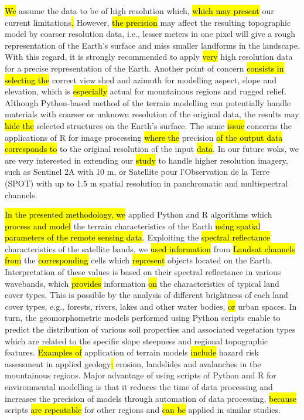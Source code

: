\documentclass[jimaging,article,submit,pdftex,moreauthors]{Definitions/mdpi}
\begin{document}
\hl{We }assume the data to be of high resolution which, \hl{which may present} our current limitations\hl{. }However, \hl{the precision }may affect the resulting topographic model by coarser\hl{ }resolution data, i.e., lesser meters in one pixel will give a rough representation of the Earth's surface and miss smaller landforms in the landscape. With this regard, it is strongly recommended to apply \hl{very }high resolution data for a precise representation of the Earth. Another point of concern \hl{consists in selecting the} correct view shed and azimuth for modelling aspect, slope and elevation, which is \hl{especially} actual for\hl{ }mountainous regions and rugged relief.\hl{ }Although Python-based method of the terrain modelling can potentially handle materials with coarser or unknown resolution of the original data, the results may \hl{hide the} selected structures on the Earth's surface. The same \hl{issue} concerns the applications of R for image processing \hl{where the} precision \hl{of the output data corresponds to } to the original resolution of the input \hl{data}. In our future woks, we are very interested in extending our \hl{study} to handle higher resolution imagery, such as Sentinel 2A with 10 m, or Satellite pour l'Observation de la Terre (SPOT) with up to 1.5 m spatial resolution in panchromatic and multispectral channels.

\hl{In the presented methodology, we} applied Python and R algorithms which \hl{process and model} the terrain characteristics of the Earth \hl{using spatial parameters of the remote sensing data}. Exploiting the \hl{spectral reflectance} characteristics of the satellite bands, we \hl{used information} from \hl{Landsat channels from} the \hl{corresponding} cells which \hl{represent} objects located on the Earth. Interpretation of these values is based on their spectral reflectance in various wavebands, which \hl{provides} information \hl{on} the characteristics of typical land cover types. This is possible by the analysis of different brightness of each land cover types, e.g., forests, rivers, lakes and other water bodies, \hl{or} urban spaces. In turn, the geomorphometric models performed using Python scripts enable to predict the distribution of various soil properties and associated vegetation types which are related to the specific slope steepness and regional topographic features. \hl{Examples of} application of terrain models \hl{include} hazard risk assessment in applied geology\hl{: }erosion, landslides and avalanches\hl{ }in the mountainous regions. Major advantage of using scripts of Python and R for environmental modelling is that it reduces the time of data processing and increases the precision of models through automation of data processing, \hl{because} scripts \hl{are repeatable} for other regions and \hl{can be }applied in similar studies.
\end{document}
